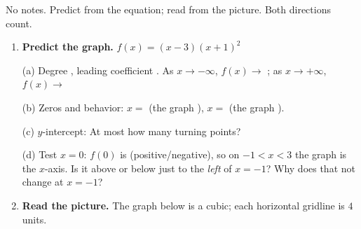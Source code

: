 \documentclass[10pt]{article}
\newcommand{\lgrid}[4]{%
  \draw[step=1, linegray!40, very thin] (#1,#3) grid (#2,#4);
  \draw[->, semithick, charcoal] (#1,0)--(#2,0) node[below right, font=\scriptsize]{$x$};
  \draw[->, semithick, charcoal] (0,#3)--(0,#4) node[left, font=\scriptsize]{$y$};}
\begin{document}
\namedateperiod

\vspace{0.08in}

No notes. Predict from the equation; read from the picture. Both directions count.

\begin{enumerate}[leftmargin=1.8em, itemsep=10pt]
  \item \textbf{Predict the graph.} $f(x) = (x-3)(x+1)^2$

    \vspace{3pt}
    (a) Degree , leading coefficient . \; As $x \to -\infty$, $f(x) \to$
    \ans{$-\infty$}; as $x \to +\infty$, $f(x) \to$ \ans{$+\infty$}

    \vspace{3pt}
    (b) Zeros and behavior: $x = $  (the graph ), \quad
    $x = $  (the graph ).

    \vspace{3pt}
    (c) $y$-intercept:  \qquad At most how many turning points? 

    \vspace{3pt}
    (d) Test $x=0$: $f(0)$ is  (positive/negative), so on $-1<x<3$ the graph is
     the $x$-axis. Is it above or below just to the \emph{left} of $x=-1$?
     \; Why does that not change at $x=-1$? 

  \item \textbf{Read the picture.} The graph below is a cubic; each horizontal gridline is $4$ units.
    \begin{center}
    \end{center}


\end{enumerate}
\end{document}
